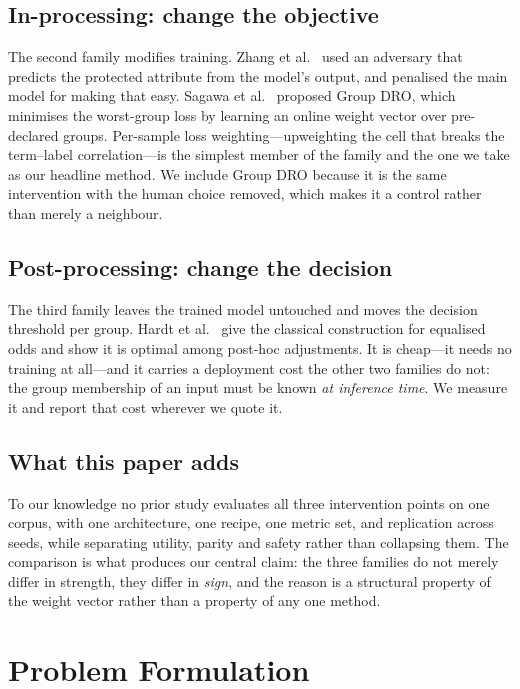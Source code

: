 \documentclass[conference]{IEEEtran}
\begin{document}
\subsection{In-processing: change the objective}
The second family modifies training. Zhang et al.~\cite{zhang2018} used an
adversary that predicts the protected attribute from the model's output, and
penalised the main model for making that easy. Sagawa et al.~\cite{sagawa2020}
proposed Group DRO, which minimises the worst-group loss by learning an online
weight vector over pre-declared groups. Per-sample loss weighting---upweighting
the cell that breaks the term--label correlation---is the simplest member of the
family and the one we take as our headline method. We include Group DRO because
it is the same intervention with the human choice removed, which makes it a
control rather than merely a neighbour.

\subsection{Post-processing: change the decision}
The third family leaves the trained model untouched and moves the decision
threshold per group. Hardt et al.~\cite{hardt2016} give the classical
construction for equalised odds and show it is optimal among post-hoc
adjustments. It is cheap---it needs no training at all---and it carries a
deployment cost the other two families do not: the group membership of an input
must be known \emph{at inference time}. We measure it and report that cost
wherever we quote it.

\subsection{What this paper adds}
To our knowledge no prior study evaluates all three intervention points on one
corpus, with one architecture, one recipe, one metric set, and replication across
seeds, while separating utility, parity and safety rather than collapsing them.
The comparison is what produces our central claim: the three families do not
merely differ in strength, they differ in \emph{sign}, and the reason is a
structural property of the weight vector rather than a property of any one
method.

\section{Problem Formulation}
\end{document}
